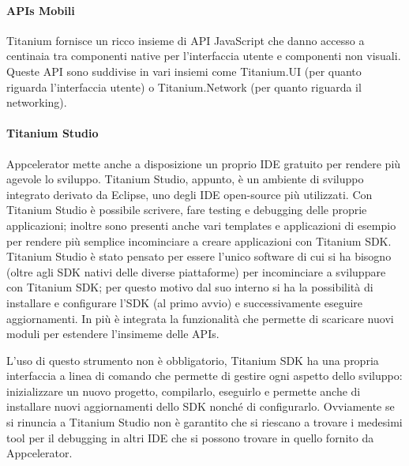 			\paragraph{APIs Mobili}
				Titanium fornisce un ricco insieme di API JavaScript che danno 
				accesso a centinaia tra componenti native per l'interfaccia 
				utente e componenti non visuali. Queste API sono suddivise in 
				vari insiemi come Titanium.UI (per quanto riguarda l'interfaccia 
				utente) o Titanium.Network (per quanto riguarda il networking).
				 
			\paragraph{Titanium Studio}
				Appcelerator mette anche a disposizione un proprio IDE gratuito 
				per rendere più agevole lo sviluppo. Titanium Studio, appunto, è 
				un ambiente di sviluppo integrato derivato da Eclipse, uno degli 
				IDE open-source più utilizzati. Con Titanium Studio è possibile 
				scrivere, fare testing e debugging delle proprie applicazioni; 
				inoltre sono presenti anche vari templates e applicazioni di 
				esempio per rendere più semplice incominciare a creare 
				applicazioni con Titanium SDK. Titanium Studio è stato 
				pensato per essere l'unico software di cui si ha bisogno (oltre 
				agli SDK nativi delle diverse piattaforme) per incominciare a 
				sviluppare con Titanium SDK; per questo motivo dal suo interno 
				si ha la possibilità di installare e configurare l'SDK (al primo 
				avvio) e successivamente eseguire aggiornamenti. In più è
				integrata la funzionalità che permette di scaricare nuovi moduli 
				per	estendere l'insimeme delle APIs.
				
				L'uso di questo strumento non è obbligatorio, Titanium SDK 
				ha una propria interfaccia a linea di comando che permette di 
				gestire ogni aspetto dello sviluppo: inizializzare un 
				nuovo progetto, compilarlo, eseguirlo e permette anche di 
				installare nuovi aggiornamenti dello SDK nonché di configurarlo.
				Ovviamente se si rinuncia a Titanium Studio non è garantito che 
				si riescano a trovare i medesimi tool per il debugging in altri 
				IDE che si possono trovare in quello fornito da Appcelerator.
				
